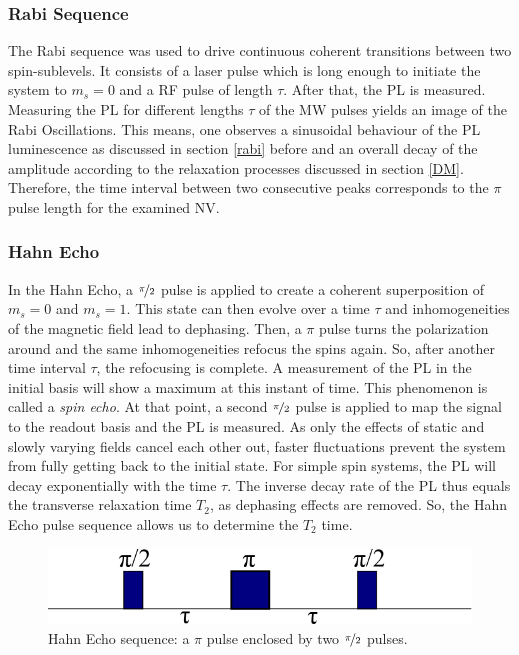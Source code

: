 \documentclass[12pt,a4paper]{article}
\begin{document}
\subsubsection{Rabi Sequence}
The Rabi sequence was used to drive continuous coherent transitions between two spin-sublevels. It consists of a laser pulse which is long enough to initiate the system to $m_s=0$ and a RF pulse of length $\tau$. After that, the PL is measured. Measuring the PL for different lengths $\tau$ of the MW pulses yields an image of the Rabi Oscillations. This means, one observes a sinusoidal behaviour of the PL luminescence as discussed in section \ref{rabi} before and an overall decay of the amplitude according to the relaxation processes discussed in section \ref{DM}. Therefore, the time interval between two consecutive peaks corresponds to the $\pi$ pulse length for the examined NV. 
\subsubsection{Hahn Echo}
In the Hahn Echo, a $\nicefrac{\pi}{2}$ pulse is applied to create a coherent superposition of $m_s=0$ and $m_s=1$. This state can then evolve over a time $\tau$ and inhomogeneities of the magnetic field lead to dephasing. Then, a $\pi$ pulse turns the polarization around and the same inhomogeneities refocus the spins again. So, after another time interval $\tau$, the refocusing is complete. A measurement of the PL in the initial basis will show a maximum at this instant of time. This phenomenon is called a \textit{spin echo}. At that point, a second $\nicefrac{\pi}{2}$ pulse is applied to map the signal to the readout basis \cite{nv1} and the PL is measured. As only the effects of static and slowly varying fields cancel each other out, faster fluctuations prevent the system from fully getting back to the initial state. For simple spin systems, the PL will decay exponentially with the time $\tau$. The inverse decay rate of the PL thus equals the transverse relaxation time $T_2$, as dephasing effects are removed. So, the Hahn Echo pulse sequence allows us to determine the $T_2$ time.
\begin{figure}[H]
\centering
\includegraphics[scale=0.4]{Hahn1.png} 
\caption{Hahn Echo sequence: a $\pi$ pulse enclosed by two $\nicefrac{\pi}{2}$ pulses.}
\end{figure} 
\end{document}
